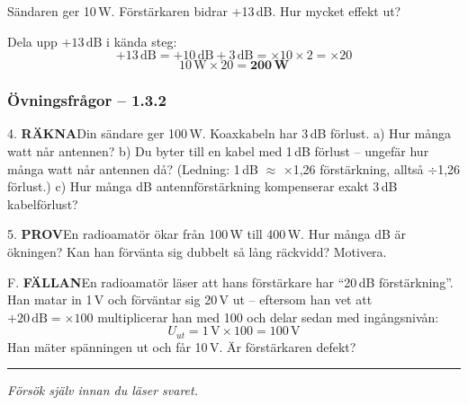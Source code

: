 \documentclass[a4paper,11pt,twoside]{book}
\newcommand{\qrakna}{\colorbox{bluepale}{\textcolor{bluedark}{\headingfont\bfseries\tiny RÄKNA}}}
\newcommand{\qprov}{\colorbox{redpale}{\textcolor{reddark}{\headingfont\bfseries\tiny PROV}}}
\newcommand{\qfallan}{\colorbox{ljusbrun}{\textcolor{kakao}{\headingfont\bfseries\tiny FÄLLAN}}}
\begin{document}
\begin{worked}[title={Räkneexempel 1.3.2-3 -- Kombinera steg}]
Sändaren ger 10\,W. Förstärkaren bidrar +13\,dB. Hur mycket effekt ut?

Dela upp $+13\,\text{dB}$ i kända steg:
\[
+13\,\text{dB} = +10\,\text{dB} + 3\,\text{dB} = \times 10 \times 2 = \times 20
\]
\[
10\,\text{W} \times 20 = \mathbf{200\,\text{W}}
\]
\end{worked}

\subsubsection*{Övningsfrågor -- 1.3.2}

\begin{qblock}{4.}
\qrakna\quad Din sändare ger 100\,W. Koaxkabeln har 3\,dB förlust.
a) Hur många watt når antennen?
b) Du byter till en kabel med 1\,dB förlust -- ungefär hur många watt når antennen då? (Ledning: 1\,dB $\approx$ ×1,26 förstärkning, alltså $\div$1,26 förlust.)
c) Hur många dB antennförstärkning kompenserar exakt 3\,dB kabelförlust?
\end{qblock}

\begin{qblock}{5.}
\qprov\quad En radioamatör ökar från 100\,W till 400\,W. Hur många dB är ökningen? Kan han förvänta sig dubbelt så lång räckvidd? Motivera.
\end{qblock}

\begin{qblock}{F.}
\qfallan\quad En radioamatör läser att hans förstärkare har 
``20\,dB förstärkning''. Han matar in 1\,V och förväntar sig 
20\,V ut -- eftersom han vet att $+20\,\text{dB} = \times 100$ 
multiplicerar han med 100 och delar sedan med ingångsnivån:
\[
U_{ut} = 1\,\text{V} \times 100 = 100\,\text{V}
\]
Han mäter spänningen ut och får 10\,V. Är förstärkaren defekt?
\end{qblock}

\medskip
\noindent\rule{\textwidth}{0.4pt}
{\small\itshape Försök själv innan du läser svaret.}
\medskip
\end{document}
